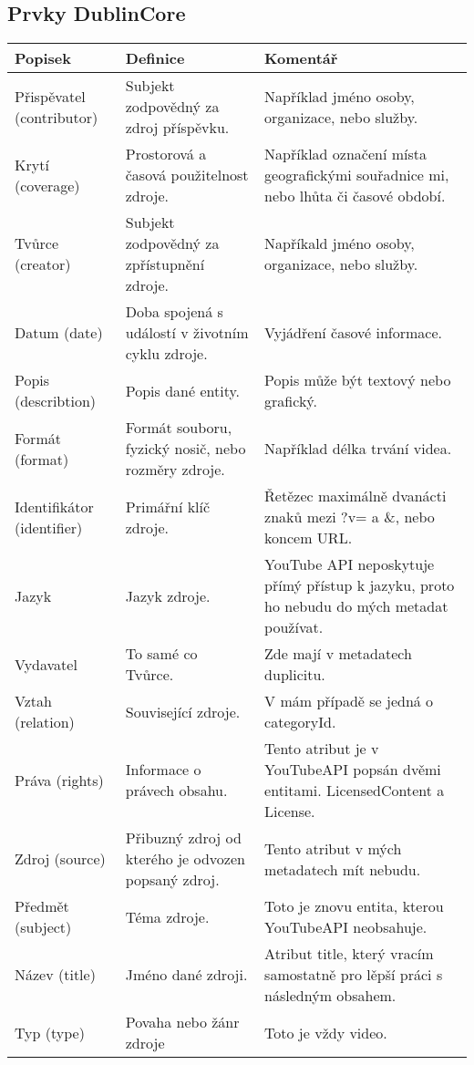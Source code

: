 \subsection{Prvky DublinCore}
\begin{tabular}{|p{} | p{} | p{}|}
\hline
Popisek & Definice & Komentář\\
\hline
Přispěvatel (contributor) & Subjekt zodpovědný za zdroj příspěvku. & Například jméno osoby, organizace, nebo služby.\\
\hline
Krytí (coverage) & Prostorová a časová použitelnost zdroje. & Například označení místa geografickými souřadnice mi, nebo lhůta či časové období.\\
\hline
Tvůrce (creator) & Subjekt zodpovědný za zpřístupnění zdroje. & Napříkald jméno osoby, organizace, nebo služby.\\
\hline
Datum (date) & Doba spojená s událostí v životním cyklu zdroje. & Vyjádření časové informace. \\
\hline
Popis (describtion) & Popis dané entity. & Popis může být textový nebo grafický. \\
\hline
Formát (format) & Formát souboru, fyzický nosič, nebo rozměry zdroje. & Například délka trvání videa. \\
\hline
Identifikátor (identifier) & Primářní klíč zdroje. & Řetězec maximálně dvanácti znaků mezi ?v= a \&, nebo koncem URL.\\
\hline
Jazyk & Jazyk zdroje. & YouTube API neposkytuje přímý přístup k jazyku, proto ho nebudu do mých metadat používat.\\
\hline
Vydavatel & To samé co Tvůrce. & Zde mají v metadatech duplicitu. \\
\hline
Vztah (relation) & Související zdroje. & V mám případě se jedná o categoryId. \\
\hline
Práva (rights) & Informace o právech obsahu. & Tento atribut je v YouTubeAPI popsán dvěmi entitami. LicensedContent a License.\\
\hline
Zdroj (source) & Přibuzný zdroj od kterého je odvozen popsaný zdroj. & Tento atribut v mých metadatech mít nebudu.\\
\hline
Předmět (subject) & Téma zdroje. & Toto je znovu entita, kterou YouTubeAPI neobsahuje.\\
\hline
Název (title) & Jméno dané zdroji. & Atribut title, který vracím samostatně pro lěpší práci s následným obsahem.\\
\hline
Typ (type) & Povaha nebo žánr zdroje & Toto je vždy video.\\
\hline
\end{tabular}
